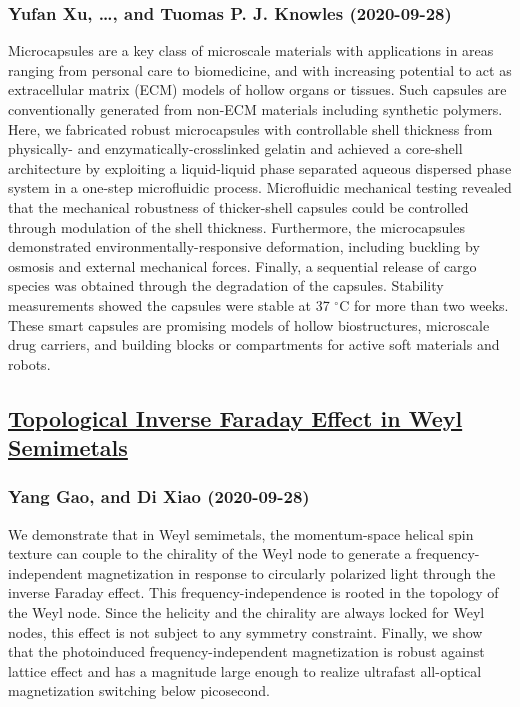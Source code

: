 \subsubsection*{Yufan Xu, \dots, and Tuomas P. J. Knowles (2020-09-28)}
Microcapsules are a key class of microscale materials with applications in
areas ranging from personal care to biomedicine, and with increasing potential
to act as extracellular matrix (ECM) models of hollow organs or tissues. Such
capsules are conventionally generated from non-ECM materials including
synthetic polymers. Here, we fabricated robust microcapsules with controllable
shell thickness from physically- and enzymatically-crosslinked gelatin and
achieved a core-shell architecture by exploiting a liquid-liquid phase
separated aqueous dispersed phase system in a one-step microfluidic process.
Microfluidic mechanical testing revealed that the mechanical robustness of
thicker-shell capsules could be controlled through modulation of the shell
thickness. Furthermore, the microcapsules demonstrated
environmentally-responsive deformation, including buckling by osmosis and
external mechanical forces. Finally, a sequential release of cargo species was
obtained through the degradation of the capsules. Stability measurements showed
the capsules were stable at 37 $^{\circ}$C for more than two weeks. These smart
capsules are promising models of hollow biostructures, microscale drug
carriers, and building blocks or compartments for active soft materials and
robots.

\subsection*{\href{http://arxiv.org/abs/2009.13392v1}{Topological Inverse Faraday Effect in Weyl Semimetals}}
\subsubsection*{Yang Gao, and Di Xiao (2020-09-28)}
We demonstrate that in Weyl semimetals, the momentum-space helical spin
texture can couple to the chirality of the Weyl node to generate a
frequency-independent magnetization in response to circularly polarized light
through the inverse Faraday effect. This frequency-independence is rooted in
the topology of the Weyl node. Since the helicity and the chirality are always
locked for Weyl nodes, this effect is not subject to any symmetry constraint.
Finally, we show that the photoinduced frequency-independent magnetization is
robust against lattice effect and has a magnitude large enough to realize
ultrafast all-optical magnetization switching below picosecond.

